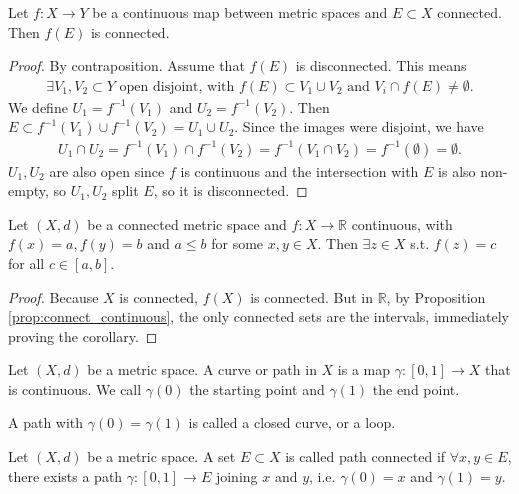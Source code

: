 \begin{prop}\label{prop:connect_continuous}
	Let $f: X \to Y$ be a continuous map between metric spaces and $E \subset X$ connected. Then $f(E)$ is connected.
\end{prop}
\begin{proof}
	By contraposition. Assume that $f(E)$ is disconnected. This means
	\begin{align*}
		\exists V_{1}, V_{2} \subset Y \text{ open disjoint, with } f(E) \subset V_{1} \cup V_{2} \text{ and } V_{i} \cap f(E) \neq \emptyset.
	\end{align*}
	We define $U_{1} = f^{-1}(V_{1})$ and $U_{2} = f^{-1}(V_{2})$. Then $E \subset f^{-1}(V_{1}) \cup  f^{-1}(V_{2}) = U_{1} \cup U_{2}$. Since the images were disjoint, we have
	\begin{align*}
		U_{1} \cap U_{2} = f^{-1}(V_{1}) \cap f^{-1}(V_{2}) = f^{-1}(V_{1} \cap V_{2}) = f^{-1}(\emptyset) = \emptyset.
	\end{align*}
	$U_{1}, U_{2}$ are also open since $f$ is continuous and the intersection with $E$ is also non-empty, so $U_{1}, U_{2}$ split $E$, so it is disconnected.
\end{proof}

\begin{corollary}
	Let $(X, d)$ be a connected metric space and $f: X \to \mathbb{R}$ continuous, with $f(x) = a, f(y) = b$ and $a \leq b$ for some $x,y \in X$. Then $\exists z \in X$ s.t. $f(z) = c$ for all $c \in [a,b]$.
\end{corollary}
\begin{proof}
	Because $X$ is connected, $f(X)$ is connected. But in $\mathbb{R}$, by Proposition \ref{prop:connect_continuous}, the only connected sets are the intervals, immediately proving the corollary.
\end{proof}

\begin{definition}[Curve]\label{def:curve}
	Let $(X,d)$ be a metric space. A curve or path in $X$ is a map $\gamma:[0,1] \to X$ that is continuous.
	We call $\gamma (0)$ the starting point and $\gamma (1)$ the end point.

	A path with $\gamma (0) = \gamma (1)$ is called a closed curve, or a loop.
\end{definition}

\begin{definition}\label{def:path-connected}
	Let $(X,d)$ be a metric space. A set $E \subset X$ is called path connected if $\forall x,y \in E$, there exists a path $\gamma: [0,1] \to E$ joining $x$ and $y$, i.e. $\gamma(0) = x$ and $\gamma (1) = y$.
\end{definition}


